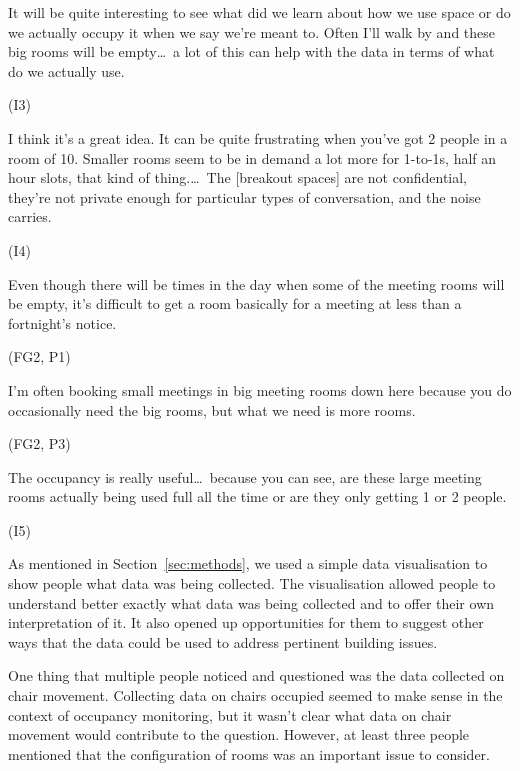 \begin{qt}It will be quite interesting to see what did we learn about how we use space or do we actually
occupy it when we say we’re meant to. Often I’ll walk by and these
big rooms will be empty\ldots\  a lot of this can help with the
data in terms of what do we actually use.\end{qt} (I3)

\begin{qt}I think it’s a great idea. It can be quite frustrating
when you’ve got 2 people in a room of 10. Smaller rooms seem to be in
demand a lot more for 1-to-1s, half an hour slots, that kind of
thing.\ldots\  The [breakout spaces] are not confidential, they’re not
private enough for particular types of conversation, and the noise
carries.\end{qt} (I4)

\begin{qt}Even though there will be times in the day
when some of the meeting rooms will be empty, it’s difficult to get a room basically for a meeting at
less than a fortnight’s notice.\end{qt} (FG2, P1)

\begin{qt}I’m often booking small meetings in big meeting rooms
  down here because you do occasionally need the big rooms, but what
  we need is more rooms.\end{qt} (FG2, P3)

\begin{qt}The occupancy is
really useful\ldots\  because you can see, are these
large meeting rooms actually being used full all the time or are they
only getting 1 or 2 people.\end{qt} (I5)


As mentioned in Section~\ref{sec:methods}, we used a simple data
visualisation to show people what data was being collected. The
visualisation allowed people to understand better exactly what data
was being collected and to offer their own interpretation of it. It
also opened up opportunities for them to suggest other ways that the
data could be used to address pertinent building issues.

One thing that multiple people noticed and questioned was the data
collected on chair movement. Collecting data on chairs occupied seemed
to make sense in the context of occupancy monitoring, but it wasn’t
clear what data on chair movement would contribute to the
question. However, at least three people mentioned that the
configuration of rooms was an important issue to consider.

